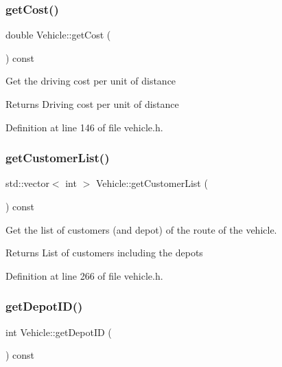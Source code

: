 \subsubsection{\texorpdfstring{get\+Cost()}{getCost()}}
{\footnotesize\ttfamily double Vehicle\+::get\+Cost (\begin{DoxyParamCaption}{ }\end{DoxyParamCaption}) const\hspace{0.3cm}{\ttfamily [inline]}}

Get the driving cost per unit of distance \begin{DoxyReturn}{Returns}
Driving cost per unit of distance 
\end{DoxyReturn}


Definition at line 146 of file vehicle.\+h.

\mbox{\label{class_vehicle_a57563afe2a3e1c6da5823a0a9a9f45dd}} 
\subsubsection{\texorpdfstring{get\+Customer\+List()}{getCustomerList()}}
{\footnotesize\ttfamily std\+::vector$<$ int $>$ Vehicle\+::get\+Customer\+List (\begin{DoxyParamCaption}{ }\end{DoxyParamCaption}) const\hspace{0.3cm}{\ttfamily [inline]}}

Get the list of customers (and depot) of the route of the vehicle. \begin{DoxyReturn}{Returns}
List of customers including the depots 
\end{DoxyReturn}


Definition at line 266 of file vehicle.\+h.

\mbox{\label{class_vehicle_a0952f9b75d0ff8df66e33e60521e0dc0}} 
\subsubsection{\texorpdfstring{get\+Depot\+I\+D()}{getDepotID()}}
{\footnotesize\ttfamily int Vehicle\+::get\+Depot\+ID (\begin{DoxyParamCaption}{ }\end{DoxyParamCaption}) const\hspace{0.3cm}{\ttfamily [inline]}}


